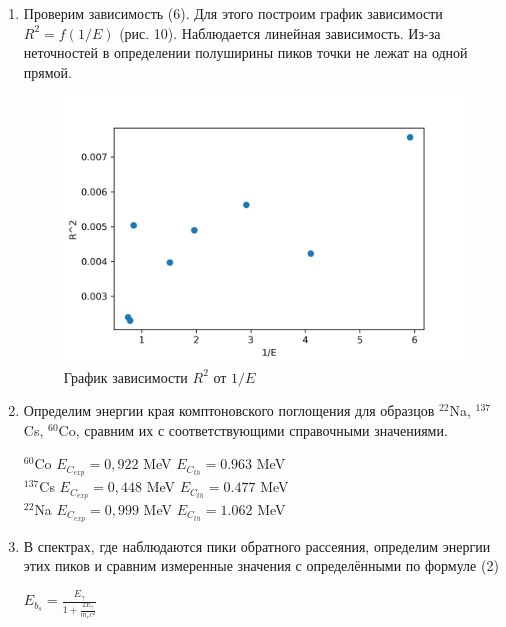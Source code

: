 \documentclass[a4paper, 12pt]{article}
\begin{document}
\begin{enumerate}
\item Проверим зависимость (6). Для этого построим график зависимости $R^2 = f(1/E)$ (рис. 10). Наблюдается линейная зависимость. Из-за неточностей в определении полуширины пиков точки не лежат на одной прямой. 

\begin{figure}[h]
\begin{center}
\includegraphics[width=12cm]{Scatter.png}
\caption{График зависимости $R^2$ от $1/E$}
\label{ris:experimoriginal} %
\end{center}
\end{figure}

\item Определим энергии края комптоновского поглощения для образцов $^{22}$Na, $^{137}$Cs, $^{60}$Co, сравним их с соответствующими справочными значениями.
\begin{center}
  $^{60}$Co \hspace{1cm} $E_C_{exp} = 0,922$ MeV \hspace{1cm} $E_C_{th} = 0.963$ MeV \\
$^{137}$Cs \hspace{1cm} $E_C_{exp} =0,448$ MeV \hspace{1cm} $E_C_{th} = 0.477$ MeV \\
$^{22}$Na \hspace{1cm} $E_C_{exp} =0,999$ MeV \hspace{1cm} $E_C_{th} = 1.062$ MeV \\
 \end{center}

\item В спектрах, где наблюдаются пики обратного рассеяния, определим энергии этих пиков и сравним измеренные значения с определёнными по формуле (2)
\begin{center}
    $E_b_s = \frac{E_{\gamma}}{1 + \frac{2E_{\gamma}}{m_e c^2}}$
\end{center}


\end{enumerate}
\end{document}
